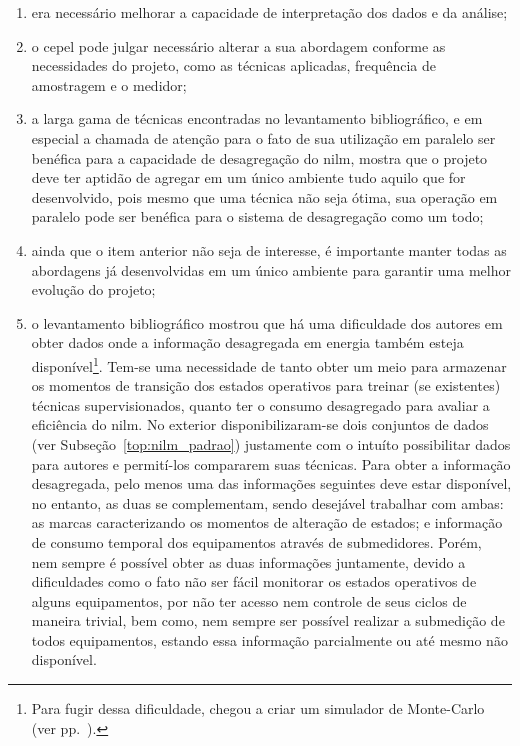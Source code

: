\begin{enumerate}[label={Item} \arabic* - ,ref=\arabic*,align=left]
\item\label{itm:dif1} era necessário melhorar a capacidade de
interpretação dos dados e da análise;
\item\label{itm:dif2} o \acs{cepel} pode julgar necessário alterar a
sua abordagem conforme as necessidades do projeto, como as técnicas
aplicadas, frequência de amostragem e o medidor;
\item\label{itm:dif3} a larga gama de técnicas encontradas no
levantamento bibliográfico, e em especial a chamada de atenção para o
fato de sua utilização em paralelo ser benéfica para a capacidade de
desagregação do \gls{nilm}, mostra que o projeto deve ter aptidão de
agregar em um único ambiente tudo aquilo que for desenvolvido, pois
mesmo que uma técnica não seja ótima, sua operação em paralelo pode
ser benéfica para o sistema de desagregação como um todo;
\item\label{itm:dif4} ainda que o item anterior não seja de interesse,
é importante manter todas as abordagens já desenvolvidas em um único
ambiente para garantir uma melhor evolução do projeto;
\item\label{itm:dif5} o levantamento bibliográfico mostrou que há uma
dificuldade dos autores em obter dados onde a informação desagregada
em energia também esteja disponível\footnote{Para fugir dessa
dificuldade, \cite{nilm_liang_pt2_2010_40} chegou a criar um simulador
de Monte-Carlo (ver pp.~\pageref{nilm:multiplas_tecnicas}).}. Tem-se uma
necessidade de tanto obter um meio para armazenar os momentos de
transição dos estados operativos para treinar (se existentes) técnicas
supervisionados, quanto ter o consumo desagregado para avaliar a
eficiência do \gls{nilm}. No exterior disponibilizaram-se dois
conjuntos de dados (ver Subseção~\ref{top:nilm_padrao}) justamente
com o intuíto possibilitar dados para autores e permití-los
compararem suas técnicas. Para obter a informação desagregada, pelo
menos uma das informações seguintes deve estar disponível, no entanto,
as duas se complementam, sendo desejável trabalhar com ambas: as
marcas caracterizando os momentos de alteração de estados;
e informação de consumo temporal dos equipamentos através de submedidores.
Porém, nem sempre é possível obter as duas informações juntamente,
devido a dificuldades como o fato não ser fácil monitorar os estados
operativos de alguns equipamentos, por não ter acesso nem controle de seus
ciclos de maneira trivial, bem como, nem sempre ser possível realizar a
submedição de todos equipamentos, estando essa informação parcialmente ou
até mesmo não disponível.
\end{enumerate}

